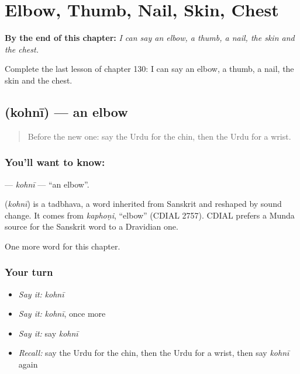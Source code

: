 
\chapter{Elbow, Thumb, Nail, Skin, Chest}
\label{ch:ur-elbow-thumb-nail-skin-chest}

\begin{chapteropening}
\textbf{By the end of this chapter:} \emph{I can say an elbow, a thumb, a nail, the skin and the chest.}

Complete the last lesson of chapter 130: I can say an elbow, a thumb, a nail, the skin and the chest.
\end{chapteropening}

\section[\texorpdfstring{\ur{کہنی} (kohnī)}{کہنی (kohnī)}]{ (kohnī) — an elbow}

\label{lesson:UR-C130-kohni}



\begin{quote}
Before the new one: say the Urdu for the chin, then the Urdu for a wrist.
\end{quote}

\subsection*{You'll want to know: }
\textbf{} — \emph{kohnī} — \textquotedblleft{}an elbow\textquotedblright{}.

\begin{cousinweb}
\textbf{} (\emph{kohnī}) is a tadbhava, a word inherited from Sanskrit and reshaped by sound change. It comes from \emph{kaphoṇi}, \textquotedblleft{}elbow\textquotedblright{} (CDIAL 2757). CDIAL prefers a Munda source for the Sanskrit word to a Dravidian one.
\end{cousinweb}

\begin{grammarlens}[title={What you've built}]
One more word for this chapter.
\end{grammarlens}

\subsection*{Your turn}
\begin{itemize}
\raggedright
  \item \emph{Say it:} \emph{kohnī}
  \item \emph{Say it:} \emph{kohnī}, once more
  \item \emph{Say it:} say \emph{kohnī}
  \item \emph{Recall:} say the Urdu for the chin, then the Urdu for a wrist, then say \emph{kohnī} again
\end{itemize}

